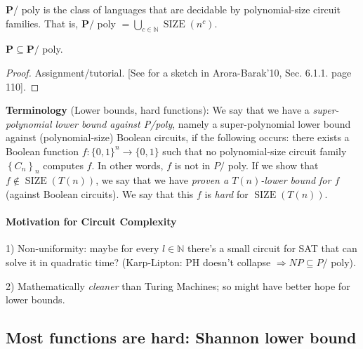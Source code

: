 \begin{definition} $\mathbf{P}$/ poly is the class of languages that are decidable by polynomial-size circuit families.
That is, $\mathbf{P} /$ poly $=\bigcup_{c \in \mathbb{N}} \operatorname{SIZE}\left(n^c\right)$.
\end{definition}


\begin{theorem}
$\mathbf{P} \subseteq \mathbf{P} /$ poly.
\end{theorem}

\begin{proof}
Assignment/tutorial.
[See for a sketch in Arora-Barak'10, Sec. 6.1.1. page 110].
\end{proof}


\begin{svgraybox}
\textbf{Terminology} (Lower bounds, hard functions):
We say that we have a \textit{super-polynomial lower bound against P/poly}, namely a super-polynomial lower bound against (polynomial-size) Boolean circuits, if the following occurs: there exists a Boolean function $f:\{0,1\}^n\to \{0,1\}$ such that no polynomial-size circuit family $\left\{C_n\right\}_n$ computes $f$. In other words, $f$ is not in $P /$ poly. If we show that $f\not\in\operatorname{SIZE}(T(n))$, we say that we have \textit{proven a $T(n)$-lower bound for $f$} (against Boolean circuits). We say that this $f$ is \emph{hard} for $\operatorname{SIZE}(T(n))$.
\end{svgraybox}



\paragraph{Motivation for Circuit Complexity}

1)  Non-uniformity: maybe for every $l \in \mathbb{N}$ there's a small circuit for SAT that can solve it in quadratic time?
(Karp-Lipton: PH doesn't collapse $\Rightarrow N P \subseteq P /$ poly).

2) Mathematically \textit{cleaner} than Turing Machines; so might have better hope for lower bounds.


\subsection{Most functions are hard: Shannon lower bound}

